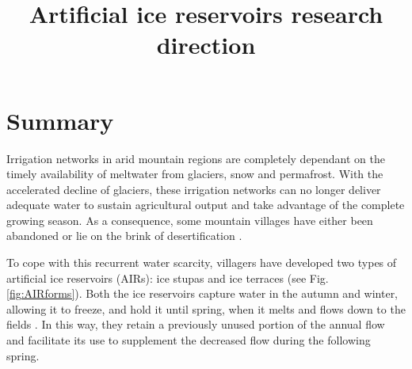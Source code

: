 \documentclass[tc]{copernicus}
\begin{document}
\nolinenumbers

\title{Artificial ice reservoirs research direction}

\def\Authors{Suryanarayanan Balasubramanian\,$^{1,2}$}

\def\corrAuthor{Suryanarayanan Balasubramanian}





\maketitle

\section{Summary}

Irrigation networks in arid mountain regions are completely dependant on the timely availability of meltwater
from glaciers, snow and permafrost. With the accelerated decline of glaciers, these irrigation networks can no
longer deliver adequate water to sustain agricultural output and take advantage of the complete growing season.
As a consequence, some mountain villages have either been abandoned or lie on the brink of desertification
\citep{grossmanHimalayanGlaciersMelt2015}.

To cope with this recurrent water scarcity, villagers have developed two types of artificial ice reservoirs
(AIRs): ice stupas and ice terraces (see Fig. \ref{fig:AIRforms}). Both the ice reservoirs capture water in the
autumn and winter, allowing it to freeze, and hold it until spring, when it melts and flows down to the fields
\citep{ipccChapterHighMountain2019, vinceGlacierMan2009, clouseLadakhArtificialGlaciers2017,
nusserSociohydrologyArtificialGlaciers2019}. In this way, they retain a previously unused portion of the annual
flow and facilitate its use to supplement the decreased flow during the following spring.
\end{document}
